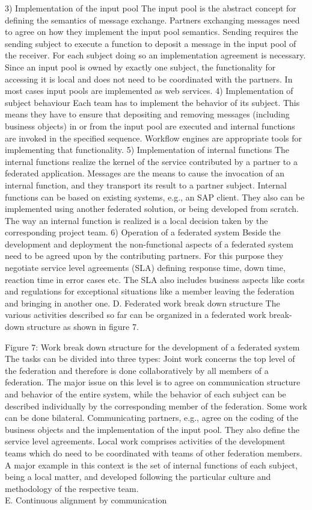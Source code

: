 3)	Implementation of the input pool
The input pool is the abstract concept for defining the semantics of message exchange. Partners exchanging messages need to agree on how they implement the input pool semantics. Sending requires the sending subject to execute a function to deposit a message in the input pool of the receiver. For each subject doing so an implementation agreement is necessary. Since an input pool is owned by exactly one subject, the functionality for accessing it is local and does not need to be coordinated with the partners. In most cases input pools are implemented as web services.
4)	Implementation of subject behaviour
Each team has to implement the behavior of its subject. This means they have to ensure that depositing and removing messages (including business objects) in or from the input pool are executed and internal functions are invoked in the specified sequence. Workflow engines are appropriate tools for implementing that functionality.
5)	Implementation of internal functions
The internal functions realize the kernel of the service contributed by a partner to a federated application. Messages are the means to cause the invocation of an internal function, and they transport its result to a partner subject. Internal functions can be based on existing systems, e.g., an SAP client.  They also can be implemented using another federated solution, or being developed from scratch. The way an internal function is realized is a local decision taken by the corresponding project team.
6)	Operation of a federated system
Beside the development and deployment the non-functional aspects of a federated system need to be agreed upon by the contributing partners. For this purpose they negotiate service level agreements (SLA) defining response time, down time, reaction time in error cases etc. The SLA also includes business aspects like costs and regulations for exceptional situations like a member leaving the federation and bringing in another one.
D.	Federated work break down structure
The various activities described so far can be organized in a federated work break-down structure as shown in figure 7.

Figure 7: Work break down structure for the development of a federated system 
The tasks can be divided into three types:
Joint work concerns the top level of the federation and therefore is done collaboratively by all members of a federation. The major issue on this level is to agree on communication structure and behavior of the entire system, while the behavior of each subject can be described individually by the corresponding member of the federation.
Some work can be done bilateral. Communicating partners, e.g., agree on the coding of the business objects and the implementation of the input pool. They also define the service level agreements.
Local work comprises activities of the development teams which do need to be coordinated with teams of other federation members. A major example in this context is the set of internal functions of each subject, being a local matter, and developed following the particular culture and methodology of the respective team.
\\
E.	Continuous alignment by communication

